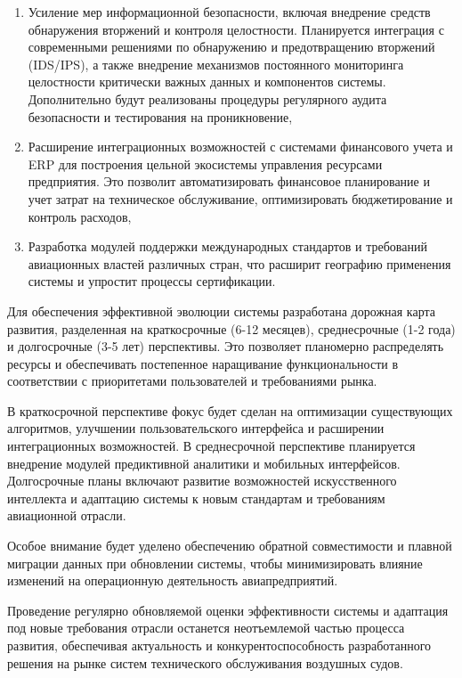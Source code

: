 \documentclass[14pt,a4paper]{extarticle}
\begin{document}
\begin{enumerate}
\item Усиление мер информационной безопасности, включая внедрение средств обнаружения вторжений и контроля целостности. Планируется интеграция с современными решениями по обнаружению и предотвращению вторжений (IDS/IPS), а также внедрение механизмов постоянного мониторинга целостности критически важных данных и компонентов системы. Дополнительно будут реализованы процедуры регулярного аудита безопасности и тестирования на проникновение,

\item Расширение интеграционных возможностей с системами финансового учета и ERP для построения цельной экосистемы управления ресурсами предприятия. Это позволит автоматизировать финансовое планирование и учет затрат на техническое обслуживание, оптимизировать бюджетирование и контроль расходов,

\item Разработка модулей поддержки международных стандартов и требований авиационных властей различных стран, что расширит географию применения системы и упростит процессы сертификации.
\end{enumerate}

Для обеспечения эффективной эволюции системы разработана дорожная карта развития, разделенная на краткосрочные (6-12 месяцев), среднесрочные (1-2 года) и долгосрочные (3-5 лет) перспективы. Это позволяет планомерно распределять ресурсы и обеспечивать постепенное наращивание функциональности в соответствии с приоритетами пользователей и требованиями рынка.

В краткосрочной перспективе фокус будет сделан на оптимизации существующих алгоритмов, улучшении пользовательского интерфейса и расширении интеграционных возможностей. В среднесрочной перспективе планируется внедрение модулей предиктивной аналитики и мобильных интерфейсов. Долгосрочные планы включают развитие возможностей искусственного интеллекта и адаптацию системы к новым стандартам и требованиям авиационной отрасли.

Особое внимание будет уделено обеспечению обратной совместимости и плавной миграции данных при обновлении системы, чтобы минимизировать влияние изменений на операционную деятельность авиапредприятий.

Проведение регулярно обновляемой оценки эффективности системы и адаптация под новые требования отрасли останется неотъемлемой частью процесса развития, обеспечивая актуальность и конкурентоспособность разработанного решения на рынке систем технического обслуживания воздушных судов.
\end{document}
